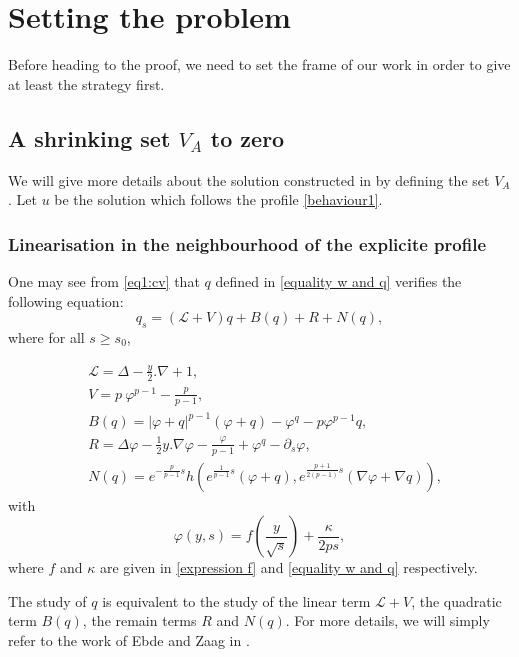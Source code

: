 \documentclass[11pt,a4paper]{article}
\newcommand{\1}{\mathbbm{1}}
\numberwithin{equation}{section}
\theoremstyle{remark}
\begin{document}
\section{Setting the problem}
Before heading to the proof, we need to set the frame of our work in order to give at least the strategy first.
\subsection{A shrinking set $V_A$ to zero}
We will give more details about the solution constructed in \cite{EZ2011} by defining the set $V_A$. Let $u$ be the solution which follows the profile \eqref{behaviour1}.
\subsubsection{Linearisation in the neighbourhood of the explicite profile}
One may see from \eqref{eq1:cv} that $q$ defined in \eqref{equality w and q} verifies the following equation:
\begin{equation*}
q_s=(\mathcal{L}+V)q+B(q)+R+N(q),
\end{equation*}
where for all $s\geq s_0$,

\begin{equation}\label{def op L}
\begin{split}
&\mathcal{L}=\Delta-\frac{y}{2}.\nabla+1,\\
&V=p\ \varphi^{p-1}-\frac{p}{p-1},\\
&B(q)=|\varphi+q|^{p-1}(\varphi+q)-\varphi^q-p\varphi^{p-1}q,\\
&R=\Delta \varphi -\frac{1}{2}y.\nabla \varphi-\frac{\varphi}{p-1}+\varphi^q-\partial_s\varphi,\\
&N(q)=e^{-\frac{p}{p-1} s}h(e^{\frac{1}{p-1} s}(\varphi+ q),e^{\frac{p+1}{2(p-1)}s}(\nabla\varphi+\nabla q)),
\end{split}
\end{equation}
with 
$$\varphi(y,s)=f\left(\frac{y}{\sqrt{s}}\right)+\frac{\kappa}{2ps},$$
where $f$ and $\kappa$ are given in \eqref{expression f} and \eqref{equality w and q} respectively.

The study of $q$ is equivalent to the study of the linear term $\mathcal{L}+V$, the quadratic term $B(q)$, the remain terms $R$ and $N(q)$. For more details, we will simply refer to the work of Ebde and Zaag in \cite{EZ2011}.
\end{document}
